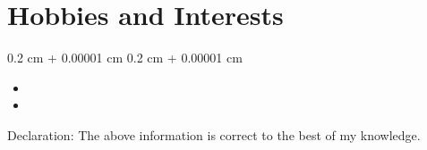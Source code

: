 \documentclass[10pt, letterpaper]{article}
\newenvironment{highlights}{
    \begin{itemize}[
        topsep=0.10 cm,
        parsep=0.10 cm,
        partopsep=0pt,
        itemsep=0pt,
        leftmargin=0.4 cm + 10pt
    ]
}{
    \end{itemize}
} %
\newenvironment{onecolentry}{
    \begin{adjustwidth}{
        0.2 cm + 0.00001 cm
    }{
        0.2 cm + 0.00001 cm
    }
}{
    \end{adjustwidth}
} %
\begin{document}
    \section{Hobbies and Interests}

        \begin{onecolentry}
            \begin{highlights}
                \item {}
                 \item {}
            \end{highlights}

        \end{onecolentry}
    
    \vspace{0.40 cm}
    Declaration: The above information is correct to the best of my knowledge.
\end{document}
